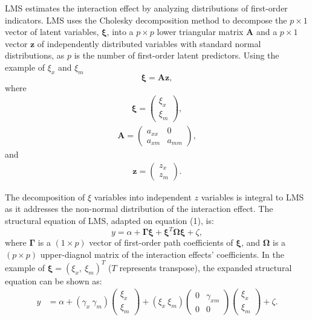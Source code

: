 \documentclass[
  man]{apa6}
\begin{document}
LMS estimates the interaction effect by analyzing distributions of first-order indicators. LMS uses the Cholesky decomposition method to decompose the \(p \times 1\) vector of latent variables, \(\mathbf{\xi}\), into a \(p \times p\) lower triangular matrix \(\mathbf{A}\) and a \(p \times 1\) vector \(\mathbf{z}\) of independently distributed variables with standard normal distributions, as \(p\) is the number of first-order latent predictors. Using the example of \(\xi_{x}\) and \(\xi_{m}\)
\begin{equation}
\mathbf{\xi} = \mathbf{A}\mathbf{z},
\end{equation}
where
\begin{align}
  \mathbf{\xi} =   
    \begin{pmatrix}
        \xi_{x} \\
        \xi_{m}
      \end{pmatrix},
\end{align}
\begin{align}
  \mathbf{A} =   
    \begin{pmatrix}
        a_{xx} & 0 \\
        a_{xm} & a_{mm}
      \end{pmatrix},
\end{align}
and
\begin{align}
  \mathbf{z} =   
    \begin{pmatrix}
        z_{x} \\
        z_{m}
      \end{pmatrix}.
\end{align}

The decomposition of \(\xi\) variables into independent \(z\) variables is integral to LMS as it addresses the non-normal distribution of the interaction effect. The structural equation of LMS, adapted on equation (1), is:
\begin{equation}
y = \alpha + \mathbf{\Gamma}\mathbf{\xi} + \mathbf{\xi}^T\mathbf{\Omega}\mathbf{\xi} + \zeta,
\end{equation}
where \(\mathbf{\Gamma}\) is a \((1 \times p)\) vector of first-order path coefficients of \(\mathbf{\xi}\), and \(\mathbf{\Omega}\) is a \((p \times p)\) upper-diagnol matrix of the interaction effects' coefficients. In the example of \(\mathbf{\xi} = (\xi_{x}, \ \xi_{m})^T\) (\(T\) represents transpose), the expanded structural equation can be shown as:
\begin{align}
    y &= \alpha + (\gamma_{x} \ \gamma_{m})
        \begin{pmatrix}
          \xi_{x} \\           
          \xi_{m}
        \end{pmatrix} +
        (\xi_{x} \ \xi_{m})
        \begin{pmatrix}
          0 & \gamma_{xm} \\           
          0 & 0
        \end{pmatrix}
        \begin{pmatrix}
          \xi_{x} \\           
          \xi_{m}
        \end{pmatrix} + 
    \zeta.
  \end{align}
\end{document}
